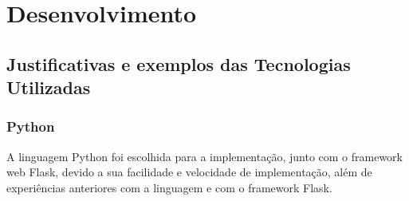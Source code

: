 \documentclass[
	article,			%
	11pt,				%
	oneside,			%
	a4paper,			%
	english,			%
	brazil,				%
	sumario=tradicional
	]{abntex2}
\begin{document}
\section{Desenvolvimento}

\subsection{Justificativas e exemplos das Tecnologias Utilizadas}

\subsubsection{Python}

A linguagem Python foi escolhida para a implementação, junto com o framework web Flask, devido a sua facilidade e velocidade de implementação, além de experiências anteriores com a linguagem e com o framework Flask.
\end{document}
